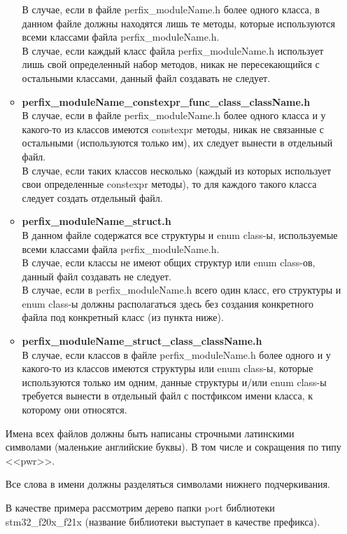 \begin{enumerate}
\begin{itemize}
		В случае, если в файле perfix\_moduleName.h более одного класса, в данном файле должны находятся лишь те методы, которые используются всеми классами файла perfix\_moduleName.h.\\
		В случае, если каждый класс файла perfix\_moduleName.h использует лишь свой определенный набор методов, никак не пересекающийся с остальными классами, данный файл создавать не следует.
		\item \textbf{perfix\_moduleName\_constexpr\_func\_class\_className.h}\\
		В случае, если в файле perfix\_moduleName.h более одного класса и у какого-то из классов имеются constexpr методы, никак не связанные с остальными (используются только им), их следует вынести в отдельный файл.\\
		В случае, если таких классов несколько (каждый из которых использует свои определенные constexpr методы), то для каждого такого класса следует создать отдельный файл.
		\item \textbf{perfix\_moduleName\_struct.h}\\		
		В данном файле содержатся все структуры и enum class-ы, используемые всеми классами файла perfix\_moduleName.h.\\		
		В случае, если классы не имеют общих структур или enum class-ов, данный файл создавать не следует.\\		
		В случае, если в perfix\_moduleName.h всего один класс, его структуры и enum class-ы должны располагаться здесь без создания конкретного файла под конкретный класс (из пункта ниже).
		\item \textbf{perfix\_moduleName\_struct\_class\_className.h}\\		
		В случае, если классов в файле perfix\_moduleName.h более одного и у какого-то из классов имеются структуры или enum class-ы, которые используются только им одним, данные структуры и/или enum class-ы требуется вынести в отдельный файл с постфиксом имени класса, к которому они относятся.
	\end{itemize}

	Имена всех файлов должны быть написаны строчными латинскими символами (маленькие английские буквы). В том числе и сокращения по типу <<pwr>>.
	
	Все слова в имени должны разделяться символами нижнего подчеркивания. 
	
	В качестве примера рассмотрим дерево папки port библиотеки stm32\_f20x\_f21x (название библиотеки выступает в качестве префикса).
	

\end{enumerate}
